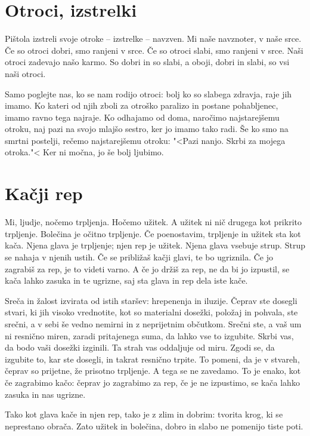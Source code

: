 \section{Otroci, izstrelki}

Pištola izstreli svoje otroke – izstrelke – navzven. Mi naše navznoter, v naše srce. Če so otroci dobri, smo ranjeni v srce. Če so otroci slabi, smo ranjeni v srce. Naši otroci zadevajo našo karmo. So dobri in so slabi, a oboji, dobri in slabi, so vsi naši otroci.

Samo poglejte nas, ko se nam rodijo otroci: bolj ko so slabega zdravja, raje jih imamo. Ko kateri od njih zboli za otroško paralizo in postane pohabljenec, imamo ravno tega najraje. Ko odhajamo od doma, naročimo najstarejšemu otroku, naj pazi na svojo mlajšo sestro, ker jo imamo tako radi. Še ko smo na smrtni postelji, rečemo najstarejšemu otroku: "<Pazi nanjo. Skrbi za mojega otroka."< Ker ni močna, jo še bolj ljubimo.

\section{Kačji rep}

Mi, ljudje, nočemo trpljenja. Hočemo užitek. A užitek ni nič drugega kot prikrito trpljenje. Bolečina je očitno trpljenje. Če poenostavim, trpljenje in užitek sta kot kača. Njena glava je trpljenje; njen rep je užitek. Njena glava vsebuje strup. Strup se nahaja v njenih ustih. Če se približaš kačji glavi, te bo ugriznila. Če jo zagrabiš za rep, je to videti varno. A če jo držiš za rep, ne da bi jo izpustil, se kača lahko zasuka in te ugrizne, saj sta glava in rep dela iste kače.

Sreča in žalost izvirata od istih staršev: hrepenenja in iluzije. Čeprav ste dosegli stvari, ki jih visoko vrednotite, kot so materialni dosežki, položaj in pohvala, ste srečni, a v sebi še vedno nemirni in z neprijetnim občutkom. Srečni ste, a vaš um ni resnično miren, zaradi pritajenega suma, da lahko vse to izgubite. Skrbi vas, da bodo vaši dosežki izginili. Ta strah vas oddaljuje od miru. Zgodi se, da izgubite to, kar ste dosegli, in takrat resnično trpite. To pomeni, da je v stvareh, čeprav so prijetne, že prisotno trpljenje. A tega se ne zavedamo. To je enako, kot če zagrabimo kačo: čeprav jo zagrabimo za rep, če je ne izpustimo, se kača lahko zasuka in nas ugrizne.

Tako kot glava kače in njen rep, tako je z zlim in dobrim: tvorita krog, ki se neprestano obrača. Zato užitek in bolečina, dobro in slabo ne pomenijo tiste poti.

